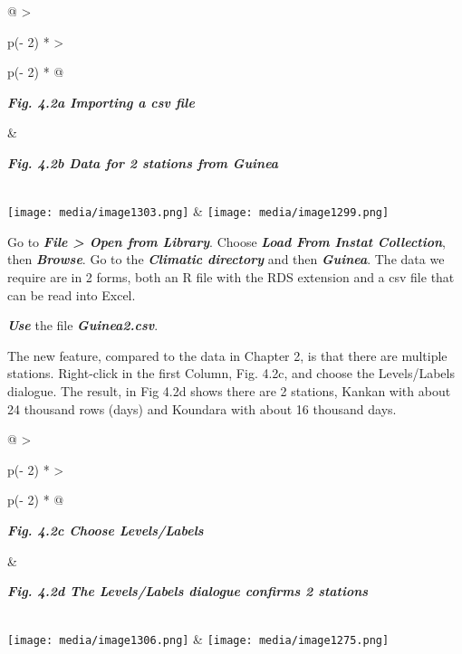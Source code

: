 \documentclass[
  letterpaper,
  DIV=11,
  numbers=noendperiod]{scrreprt}
\begin{document}
\begin{longtable}[]{@{}
  >{\raggedright\arraybackslash}p{(\columnwidth - 2\tabcolsep) * }
  >{\raggedright\arraybackslash}p{(\columnwidth - 2\tabcolsep) * }@{}}
\toprule\noalign{}
\begin{minipage}[b]{\linewidth}\raggedright
\textbf{\emph{Fig. 4.2a Importing a csv file}}
\end{minipage} & \begin{minipage}[b]{\linewidth}\raggedright
\textbf{\emph{Fig. 4.2b Data for 2 stations from Guinea}}
\end{minipage} \\
\midrule\noalign{}
\endhead
\bottomrule\noalign{}
\endlastfoot
\texttt{[image: media/image1303.png]}
&
\texttt{[image: media/image1299.png]} \\
\end{longtable}

Go to \textbf{\emph{File \textgreater{} Open from Library}}. Choose
\textbf{\emph{Load From Instat Collection}}, then
\textbf{\emph{Browse}}. Go to the \textbf{\emph{Climatic directory}} and
then \textbf{\emph{Guinea}}. The data we require are in 2 forms, both an
R file with the RDS extension and a csv file that can be read into
Excel.

\textbf{\emph{Use}} the file \textbf{\emph{Guinea2.csv}}.

The new feature, compared to the data in Chapter 2, is that there are
multiple stations. Right-click in the first Column, Fig. 4.2c, and
choose the Levels/Labels dialogue. The result, in Fig 4.2d shows there
are 2 stations, Kankan with about 24 thousand rows (days) and Koundara
with about 16 thousand days.

\begin{longtable}[]{@{}
  >{\raggedright\arraybackslash}p{(\columnwidth - 2\tabcolsep) * }
  >{\raggedright\arraybackslash}p{(\columnwidth - 2\tabcolsep) * }@{}}
\toprule\noalign{}
\begin{minipage}[b]{\linewidth}\raggedright
\textbf{\emph{Fig. 4.2c Choose Levels/Labels}}
\end{minipage} & \begin{minipage}[b]{\linewidth}\raggedright
\textbf{\emph{Fig. 4.2d The Levels/Labels dialogue confirms 2 stations}}
\end{minipage} \\
\midrule\noalign{}
\endhead
\bottomrule\noalign{}
\endlastfoot
\texttt{[image: media/image1306.png]} &
\texttt{[image: media/image1275.png]} \\
\end{longtable}
\end{document}
